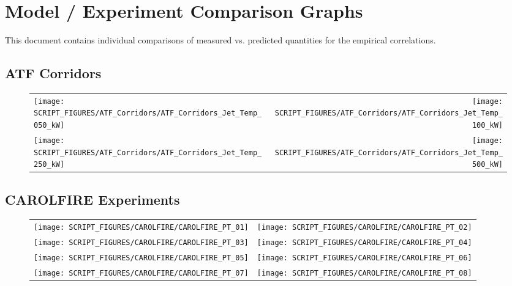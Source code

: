 
\chapter{Model / Experiment Comparison Graphs}
\label{chap:Graphs}

This document contains individual comparisons of measured vs. predicted quantities for the empirical correlations.

\section{ATF Corridors}

\begin{figure}[!ht]
\begin{tabular*}{\textwidth}{l@{\extracolsep{\fill}}r}
\texttt{[image: SCRIPT\_FIGURES/ATF\_Corridors/ATF\_Corridors\_Jet\_Temp\_050\_kW]} &
\texttt{[image: SCRIPT\_FIGURES/ATF\_Corridors/ATF\_Corridors\_Jet\_Temp\_100\_kW]} \\
\texttt{[image: SCRIPT\_FIGURES/ATF\_Corridors/ATF\_Corridors\_Jet\_Temp\_250\_kW]} &
\texttt{[image: SCRIPT\_FIGURES/ATF\_Corridors/ATF\_Corridors\_Jet\_Temp\_500\_kW]}
\end{tabular*}
\end{figure}

\clearpage

\section{CAROLFIRE Experiments}

\begin{figure}[!ht]
\begin{tabular*}{\textwidth}{l@{\extracolsep{\fill}}r}
\texttt{[image: SCRIPT\_FIGURES/CAROLFIRE/CAROLFIRE\_PT\_01]} &
\texttt{[image: SCRIPT\_FIGURES/CAROLFIRE/CAROLFIRE\_PT\_02]} \\
\texttt{[image: SCRIPT\_FIGURES/CAROLFIRE/CAROLFIRE\_PT\_03]} &
\texttt{[image: SCRIPT\_FIGURES/CAROLFIRE/CAROLFIRE\_PT\_04]} \\
\texttt{[image: SCRIPT\_FIGURES/CAROLFIRE/CAROLFIRE\_PT\_05]} &
\texttt{[image: SCRIPT\_FIGURES/CAROLFIRE/CAROLFIRE\_PT\_06]} \\
\texttt{[image: SCRIPT\_FIGURES/CAROLFIRE/CAROLFIRE\_PT\_07]} &
\texttt{[image: SCRIPT\_FIGURES/CAROLFIRE/CAROLFIRE\_PT\_08]}
\end{tabular*}
\end{figure}

